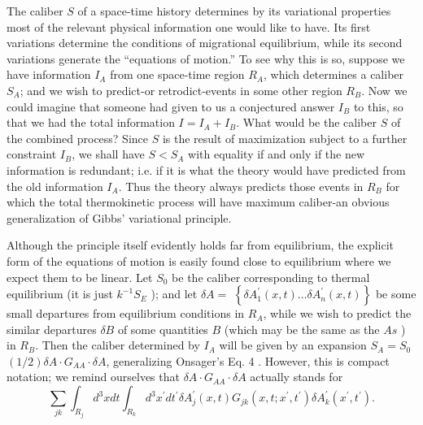 \documentclass{article}
\begin{document}
The caliber $S$ of a space-time history determines by its variational properties most of the relevant physical information one would like to have. Its first variations determine the conditions of migrational equilibrium, while its second variations generate the ``equations of motion.'' To see why this is so, suppose we have information $I_A$ from one space-time region $R_A$, which determines a caliber $S_A$; and we wish to predict-or retrodict-events in some other region $R_B$. Now we could imagine that someone had given to us a conjectured answer $I_B$ to this, so that we had the total information $I=I_A+I_B$. What would be the caliber $S$ of the combined process? Since $S$ is the result of maximization subject to a further constraint $I_B$, we shall have $S<S_A$ with equality if and only if the new information is redundant; i.e. if it is what the theory would have predicted from the old information $I_A$. Thus the theory always predicts those events in $R_B$ for which the total thermokinetic process will have maximum caliber-an obvious generalization of Gibbs' variational principle.

Although the principle itself evidently holds far from equilibrium, the explicit form of the equations of motion is easily found close to equilibrium where we expect them to be linear. Let $S_0$ be the caliber corresponding to thermal equilibrium (it is just $k^{-1} S_E$ ); and let $\delta A=$ $\left\{\delta A_1^{\prime}(x, t) \ldots \delta A_n^{\prime}(x, t)\right\}$ be some small departures from equilibrium conditions in $R_A$, while we wish to predict the similar departures $\delta B$ of some quantities $B$ (which may be the same as the $A s$ ) in $R_B$. Then the caliber determined by $I_A$ will be given by an expansion $S_A=S_0$ $(1 / 2) \delta A \cdot G_{A A} \cdot \delta A$, generalizing Onsager's Eq. 4 . However, this is compact notation; we remind ourselves that $\delta A \cdot G_{A A} \cdot \delta A$ actually stands for
$$
\sum_{j k} \int_{R_j} d^3 x d t \int_{R_k} d^3 x^{\prime} d t^{\prime} \delta A_j^{\prime}(x, t) G_{j k}\left(x, t ; x^{\prime}, t^{\prime}\right) \delta A_k^{\prime}\left(x^{\prime}, t^{\prime}\right).
$$
\end{document}
